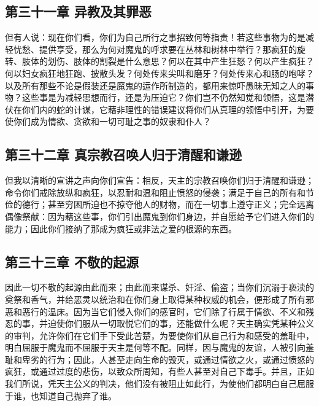 
\subsection{第三十一章 异教及其罪恶}

但有人说：现在你们看，你们为自己所行之事招致何等指责！若这些事物为的是减轻忧愁、提供享受，那么为何对魔鬼的呼求要在丛林和树林中举行？那疯狂的旋转、肢体的划伤、肢体的割裂是什么意思？何以在其中产生狂怒？何以产生疯狂？何以妇女疯狂地狂跑、披散头发？何处传来尖叫和磨牙？何处传来心和肠的咆哮？以及所有那些不论是假装还是魔鬼的运作所制造的，都用来惊吓愚昧无知之人的事物？这些事是为减轻思想而行，还是为压迫它？你们岂不仍然知觉和领悟，这是潜伏在你们内的蛇的计谋，它藉非理性的错误建议将你们从真理的领悟中引开，为要使你们成为情欲、贪欲和一切可耻之事的奴隶和仆人？\par


\subsection{第三十二章 真宗教召唤人归于清醒和谦逊}

但我以清晰的宣讲之声向你们宣告：相反，天主的宗教召唤你们归于清醒和谦逊；命令你们戒除放纵和疯狂，以忍耐和温和阻止愤怒的侵袭；满足于自己的所有和节俭的德行；甚至穷困所迫也不掠夺他人的财物，而在一切事上遵守正义；完全远离偶像祭献：因为藉这些事，你们引出魔鬼到你们身边，并自愿给予它们进入你们的能力；因此你们接纳了那成为疯狂或非法之爱的根源的东西。\par


\subsection{第三十三章 不敬的起源}

因此一切不敬的起源由此而来；由此而来谋杀、奸淫、偷盗；当你们沉溺于亵渎的奠祭和香气，并给恶灵以统治和在你们身上取得某种权威的机会，便形成了所有邪恶和恶行的温床。因为当它们侵入你们的感官时，它们除了行属于情欲、不义和残忍的事，并迫使你们服从一切取悦它们的事，还能做什么呢？天主确实凭某种公义的审判，允许你们在它们手下受此苦楚，为要使你们从自己行为和感受的羞耻中，明白屈服于魔鬼而不屈服于天主是何等不配。同样，因与魔鬼的友谊，人被引向羞耻和卑劣的行为；因此，人甚至走向生命的毁灭，或通过情欲之火，或通过愤怒的疯狂，或通过过度的悲伤，以致众所周知，有些人甚至对自己下毒手。并且，正如我们所说，凭天主公义的判决，他们没有被阻止如此行，为使他们都明白自己屈服于谁，也知道自己抛弃了谁。\par

